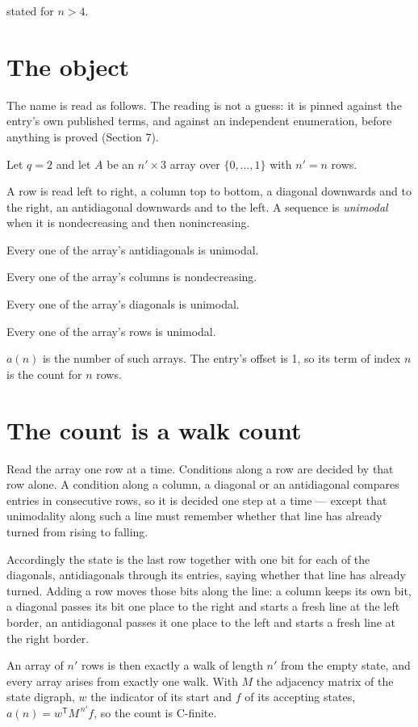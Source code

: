 \documentclass[11pt]{article}
\theoremstyle{definition}
\begin{document}
stated for $n > 4$.

\section{The object}

The name is read as follows. The reading is not a guess: it is pinned against the entry's own published terms, and against an independent enumeration, before anything is proved (Section 7).

Let $q = 2$ and let $A$ be an $n' \times 3$ array over $\{0,\dots,1\}$ with $n' = n$ rows.

A row is read left to right, a column top to bottom, a diagonal downwards and to the right, an antidiagonal downwards and to the left. A sequence is {\itshape unimodal} when it is nondecreasing and then nonincreasing.

Every one of the array's antidiagonals is unimodal.

Every one of the array's columns is nondecreasing.

Every one of the array's diagonals is unimodal.

Every one of the array's rows is unimodal.

$a(n)$ is the number of such arrays. The entry's offset is 1, so its term of index $n$ is the count for $n$ rows.

\section{The count is a walk count}

Read the array one row at a time. Conditions along a row are decided by that row alone. A condition along a column, a diagonal or an antidiagonal compares entries in consecutive rows, so it is decided one step at a time --- except that unimodality along such a line must remember whether that line has already turned from rising to falling.

Accordingly the state is the last row together with one bit for each of the diagonals, antidiagonals through its entries, saying whether that line has already turned. Adding a row moves those bits along the line: a column keeps its own bit, a diagonal passes its bit one place to the right and starts a fresh line at the left border, an antidiagonal passes it one place to the left and starts a fresh line at the right border.

An array of $n'$ rows is then exactly a walk of length $n'$ from the empty state, and every array arises from exactly one walk. With $M$ the adjacency matrix of the state digraph, $w$ the indicator of its start and $f$ of its accepting states, $a(n) = w^{\mathsf T}M^{\,n'}f$, so the count is C-finite.
\end{document}

